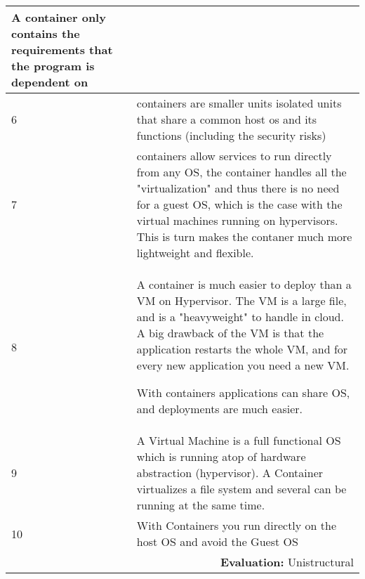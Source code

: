 \begin{longtable}{|p{0.3cm}|p{14.7cm}|}
\noindent A container only contains the requirements that the program is dependent on \\ \hline

6 & containers are smaller units isolated units that share a common host os and its functions (including the security risks) \\ \hline

7 & containers allow services to run directly from any OS, the container handles all the "virtualization" and thus there is no need for a guest OS, which is the case with the virtual machines running on hypervisors. This is turn makes the contaner much more lightweight and flexible. \\ \hline

8 & A container is much easier to deploy than a VM on Hypervisor. The VM is a large file, and is a "heavyweight" to handle in cloud. A big drawback of the VM is that the application restarts the whole VM, and for every new application you need a new VM.

\noindent With containers applications can share OS, and deployments are much easier. \\ \hline

9 & A Virtual Machine is a full functional OS which is running atop of hardware abstraction (hypervisor). A Container virtualizes a file system and several can be running at the same time.  \\ \hline

10 & With Containers you run directly on the host OS and avoid the Guest OS \\ \hline

\multicolumn{2}{r}{\textbf{Evaluation:} Unistructural} \\ 
\end{longtable}
\normalsize




